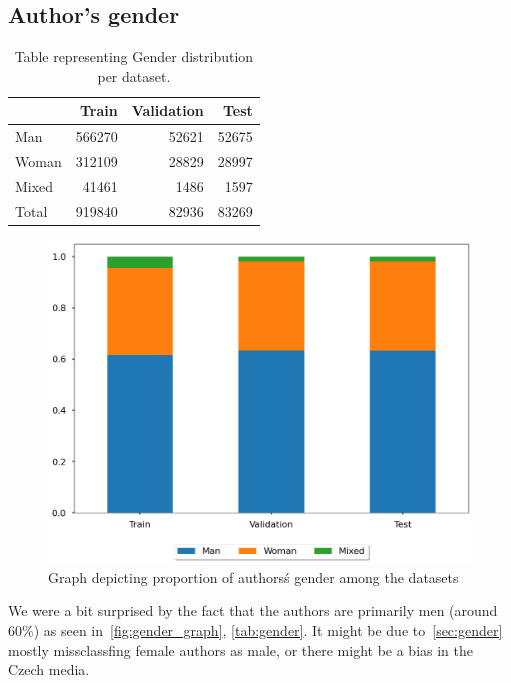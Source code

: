 \subsection{Author's gender}
\begin{table}[h]
    \centering\footnotesize\sf
    \begin{tabular}{lrrr}
        \toprule
        {}    & Train  & Validation & Test  \\
        \midrule
        Man   & 566270 & 52621      & 52675 \\
        Woman & 312109 & 28829      & 28997 \\
        Mixed & 41461  & 1486       & 1597  \\
        \midrule
        Total & 919840 & 82936      & 83269 \\
        \bottomrule
    \end{tabular}
    \caption{Table representing Gender distribution per dataset.}
    \label{tab:gender}
\end{table}
\begin{figure}[h]
    \centering
    \includegraphics[width=.6\linewidth]{img/tasks_graph/authors_cum_gender.png}
    \caption{Graph depicting proportion of authors\'s gender among the datasets}
    \label{fig:gender_graph}
\end{figure}
We were a bit surprised by the fact that the authors are primarily men (around $60\%$) as seen in~\autoref{fig:gender_graph}, \autoref{tab:gender}.
It might be due to~\autoref{sec:gender} mostly missclassfing female authors as male, or there might be a bias in the Czech media. 
